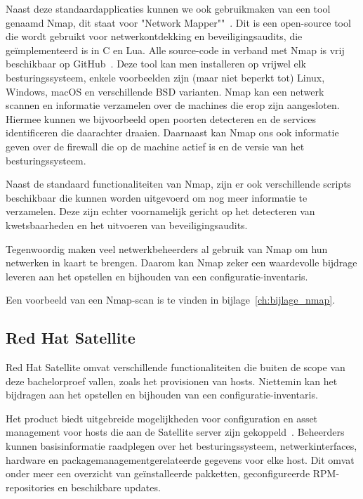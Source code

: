 Naast deze standaardapplicaties kunnen we ook gebruikmaken van een tool genaamd Nmap, dit staat voor "Network Mapper""~\autocite{nmap-website}.
Dit is een open-source tool die wordt gebruikt voor netwerkontdekking en beveiligingsaudits, die ge\"implementeerd is in C en Lua.
Alle source-code in verband met Nmap is vrij beschikbaar op GitHub~\autocite{nmap-github}.
Deze tool kan men installeren op vrijwel elk besturingssysteem, enkele voorbeelden zijn (maar niet beperkt tot) Linux, Windows, macOS en verschillende BSD varianten.
Nmap kan een netwerk scannen en informatie verzamelen over de machines die erop zijn aangesloten.
Hiermee kunnen we bijvoorbeeld open poorten detecteren en de services identificeren die daarachter draaien.
Daarnaast kan Nmap ons ook informatie geven over de firewall die op de machine actief is en de versie van het besturingssysteem.

Naast de standaard functionaliteiten van Nmap, zijn er ook verschillende scripts beschikbaar die kunnen worden uitgevoerd om nog meer informatie te verzamelen.
Deze zijn echter voornamelijk gericht op het detecteren van kwetsbaarheden en het uitvoeren van beveiligingsaudits.

Tegenwoordig maken veel netwerkbeheerders al gebruik van Nmap om hun netwerken in kaart te brengen.
Daarom kan Nmap zeker een waardevolle bijdrage leveren aan het opstellen en bijhouden van een configuratie-inventaris.

Een voorbeeld van een Nmap-scan is te vinden in bijlage~\ref{ch:bijlage_nmap}.

\subsection{Red Hat Satellite}
\label{sub:red-hat-satellite}

Red Hat Satellite omvat verschillende functionaliteiten die buiten de scope van deze bachelorproef vallen, zoals het provisionen van hosts.
Niettemin kan het bijdragen aan het opstellen en bijhouden van een configuratie-inventaris.

Het product biedt uitgebreide mogelijkheden voor configuration en asset management voor hosts die aan de Satellite server zijn gekoppeld~\autocite{rhel-satellite-hosts}.
Beheerders kunnen basisinformatie raadplegen over het besturingssysteem, netwerkinterfaces, hardware en packagemanagementgerelateerde gegevens voor elke host.
Dit omvat onder meer een overzicht van geïnstalleerde pakketten, geconfigureerde RPM-repositories en beschikbare updates.

